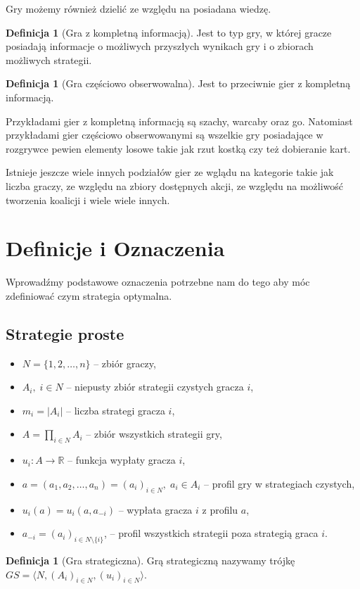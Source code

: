 \documentclass[inzynierska]{pwr_wmat_praca_dyplomowa}
\theoremstyle{plain}
\numberwithin{theorem}{chapter}
\theoremstyle{definition}
\numberwithin{theorem}{chapter}
\newtheorem{definition}[theorem]{Definicja}
\begin{document}
Gry możemy również dzielić ze względu na posiadana wiedzę.
\begin{definition}[Gra z kompletną informacją]
	Jest to typ gry, w której gracze posiadają informacje o możliwych
	przyszłych wynikach gry i o zbiorach możliwych strategii.
\end{definition}
\begin{definition}[Gra częściowo obserwowalna]
	Jest to przeciwnie gier z kompletną informacją.
\end{definition}
Przykładami gier z kompletną informacją są szachy, warcaby oraz go.
Natomiast przykładami gier częściowo obserwowanymi są wszelkie gry posiadające w rozgrywce pewien elementy losowe takie jak rzut kostką czy też dobieranie kart. 

Istnieje jeszcze wiele innych podziałów gier ze wglądu na kategorie takie jak liczba graczy, ze względu na zbiory dostępnych akcji, ze względu na możliwość tworzenia koalicji i wiele wiele innych.

\section{Definicje i Oznaczenia}
Wprowadźmy podstawowe oznaczenia potrzebne nam do tego aby móc zdefiniować czym strategia optymalna.
\subsection{Strategie proste}
\begin{itemize}
	\item $ N = \{1,2,\dots, n\} $ -- zbiór graczy,
	\item $A_i,\; i \in N $ -- niepusty zbiór strategii  czystych gracza $i$,
	\item $m_i = |A_i|$ -- liczba strategi gracza $i$,
	\item $A = \displaystyle\prod_{i \in N} A_i$ -- zbiór wszystkich strategii gry, 
	\item $u_i : A \rightarrow \mathbb{R} $ -- funkcja wypłaty gracza $i$,
	\item $a=(a_1,a_2,\dots,a_n)=(a_i)_{i \in N},\; a_i \in A_i$ -- profil gry w strategiach czystych,
	\item $u_i(a) = u_i(a,a_{-i})$ -- wypłata gracza $i$ z profilu $a$,
	\item $a_{-i} = (a_i)_{i\in N \setminus \{i\}}$, -- profil wszystkich strategii poza strategią graca $i$.
\end{itemize}
	\begin{definition}[Gra strategiczna]
		Grą strategiczną nazywamy trójkę $GS = \langle N, (A_i)_{i \in N},(u_i)_{i \in N} \rangle $.
	\end{definition}
	
\end{document}
